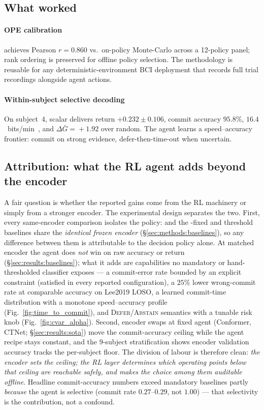 
\subsection{What worked}\label{sec:disc:worked}

\paragraph*{OPE calibration}
\fqe{} achieves Pearson $r=0.860$ vs.\ on-policy Monte-Carlo
across a 12-policy panel; rank ordering is preserved for offline
policy selection. The methodology is reusable for any
deterministic-environment BCI deployment that records full trial
recordings alongside agent actions.

\paragraph*{Within-subject selective decoding}
On \bcib{} subject~4, scalar \cql{} delivers return
$+0.232\!\pm\!0.106$, commit accuracy $95.8\%$,
$16.4$~bits/min~\itr{}, and $\Delta\bar G\!=\!+1.92$ over
random. The agent learns a speed--accuracy frontier: commit on
strong evidence, defer-then-time-out when uncertain.

\subsection{Attribution: what the RL agent adds beyond the
encoder}\label{sec:disc:attribution}

A fair question is whether the reported gains come from the RL
machinery or simply from a stronger encoder. The experimental
design separates the two. First, every same-encoder comparison
isolates the policy: \nettype{} and the \eegnet{}-fixed and
threshold baselines share the \emph{identical frozen encoder}
(\S\ref{sec:methods:baselines}), so any difference between them
is attributable to the decision policy alone. At matched encoder
the agent does \emph{not} win on raw accuracy or return
(\S\ref{sec:results:baselines}); what it adds are capabilities no
mandatory or hand-thresholded classifier exposes --- a
commit-error rate bounded by an explicit constraint (satisfied in
every reported configuration), a $25\%$ lower wrong-commit rate
at comparable accuracy on Lee2019 LOSO, a learned commit-time
distribution with a monotone speed--accuracy profile
(Fig.~\ref{fig:time_to_commit}), and \textsc{Defer}/\textsc{Abstain}
semantics with a tunable risk knob (Fig.~\ref{fig:cvar_alpha}).
Second, encoder swaps at fixed agent (Conformer, CTNet;
\S\ref{sec:results:sota}) move the commit-accuracy ceiling while
the agent recipe stays constant, and the 9-subject stratification
shows encoder validation accuracy tracks the per-subject floor.
The division of labour is therefore clean: \emph{the encoder sets
the ceiling; the RL layer determines which operating points below
that ceiling are reachable safely, and makes the choice among
them auditable offline}. Headline commit-accuracy numbers exceed
mandatory baselines partly \emph{because} the agent is selective
(commit rate $0.27$--$0.29$, not $1.00$) --- that selectivity is
the contribution, not a confound.

